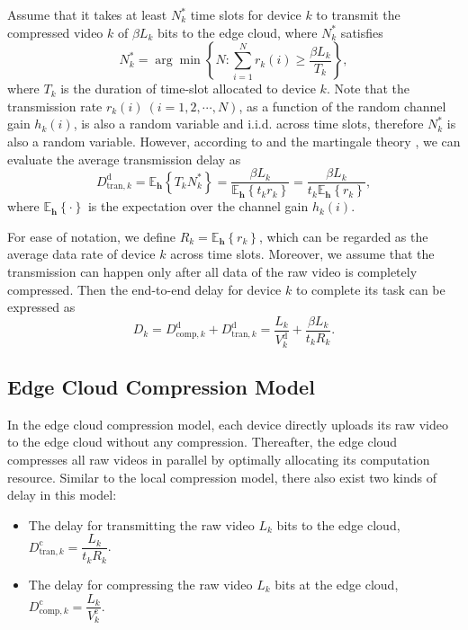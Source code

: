 \documentclass[journal,draftcls,onecolumn,12pt,twoside]{IEEEtran}
\begin{document}
Assume that it takes at least $N_k^*$ time slots for device $k$ to transmit the compressed video $k$ of $\beta L_k$ bits to the edge cloud, where $N_k^*$ satisfies
\begin{equation}
    N_k^*= \arg \min \left\{ N : \sum_{i=1}^N r_k(i) \ge \frac{\beta L_k} {T_k}\right\},\label{average slot}
\end{equation}
where $T_k$ is the duration of time-slot allocated to device $k$. Note that the transmission rate $r_k(i)~(i=1,2,\cdots,N)$, as a function of the random channel gain $h_k(i)$, is also a random variable and i.i.d. across time slots, therefore $N_k^*$ is also a random variable. However, according to \cite {Rate_reference} and the martingale theory \cite{Martingale}, we can evaluate the average transmission delay as
\begin{equation}
D_{\text{tran},k}^{\text{d}} = \mathbb{E}_{ {\boldsymbol{h}}} \left\{ T_k N_k^* \right\} = \dfrac{\beta L_k} { \mathbb{E}_{ {\boldsymbol{h}}} \left\{ t_k r_k\right\}}=\dfrac{\beta L_k} { t_k\mathbb{E}_{ {\boldsymbol{h}}}\left\{ r_k\right\}}, \label{2}
\end{equation}
where $\mathbb{E}_{{\boldsymbol{h}}} \left\{ \cdot \right\}$ is the expectation over the channel gain $h_k(i)$.

For ease of notation, we define $R_k=\mathbb{E}_{ {\boldsymbol{h}}}\left\{ r_k\right\}$, which can be regarded as the average data rate of device $k$ across time slots. Moreover, we assume that the transmission can happen only after all data of the raw video is completely compressed. Then the end-to-end delay for device $k$ to complete its task can be expressed as
\begin{equation}
    D_k = D_{\text{comp},k}^{\text{d}} + D_{\text{tran},k}^{\text{d}} = \frac{L_k}{V_k^{\text{d}}} + \frac{\beta L_k}{t_k R_k}. \label{3}
\end{equation}

\subsection{Edge Cloud Compression Model}
In the edge cloud compression model, each device directly uploads its raw video to the edge cloud without any compression. Thereafter, the edge cloud compresses all raw videos in parallel by optimally allocating its computation resource. Similar to the local compression model, there also exist two kinds of delay in this model:
\begin{itemize}
	\item The delay for transmitting the raw video $L_k$ bits to the edge cloud, $D_{\text{tran},k}^{\text{c}} = \dfrac{L_k}{t_k R_k}$.
	\item The delay for compressing the raw video $L_k$ bits at the edge cloud, $D_{\text{comp},k}^{\text{c}} = \dfrac{L_k}{V_k^{\text{c}}}$.
\end{itemize}
\end{document}
